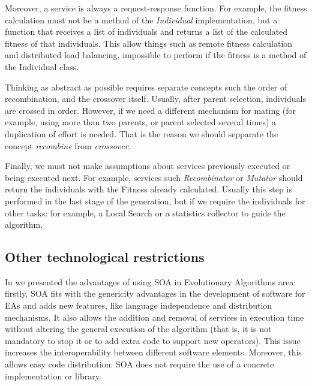 \documentclass{sig-alternate}
\begin{document}
Moreover, a service is always a request-response function. For example, the fitness calculation must not be a method of the {\em Individual} implementation, but a function that receives a list of individuals and returns a list of the calculated fitness of that individuals. This allow things such as remote fitness calculation and distributed load balancing, impossible to perform if the fitness is a method of the Individual class.



Thinking as abstract as possible requires separate concepts such the order of recombination, and the crossover itself. Usually, after parent selection, individuals are crossed in order. However, if we need a different mechanism for mating (for example, using more than two parents, or parent selected several times) a duplication of effort is needed. That is the reason we should sepparate the concept {\em recombine} from {\em crossover}. 

Finally, we must not make assumptions about services previously executed or being executed next. For example, services such {\em Recombinator} or {\em Mutator} should return the individuals with the Fitness already calculated. Usually this step is performed in the last stage of the generation, but if we require the individuals for other tasks: for example, a Local Search or a statistics collector to guide the algorithm.

\subsection{Other technological restrictions}

In \cite{OSGILIATH} we presented the advantages of using SOA in Evolutionary Algorithms area: firstly, SOA fits with the genericity advantages in the development of software for EAs \cite{GENERICITY05} and adds new features, like language independence and  distribution mechanisms. It also allows the addition and removal of services in execution time without altering the general execution of the algorithm (that is, it is not mandatory to stop it or to add extra code to support new operators). This issue increases the interoperability between different software elements. Moreover, this allows easy code distribution: SOA does not require the use of a concrete implementation or library.
\end{document}
